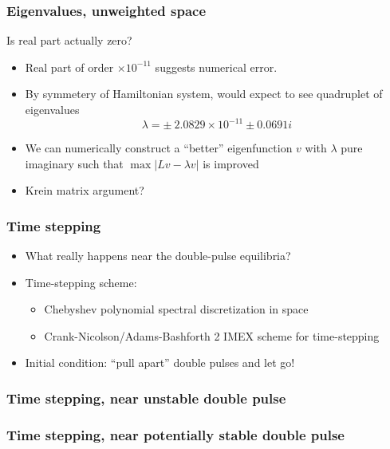 \documentclass[16pt]{beamer}
\begin{document}
\begin{frame}
	\frametitle{Eigenvalues, unweighted space}
	Is real part actually zero?
	\begin{itemize}
		\item<1->Real part of order $\times 10^{-11}$ suggests numerical error.
		\item<2->By symmetery of Hamiltonian system, would expect to see quadruplet of eigenvalues
		 \[ \lambda = \pm \: 2.0829 \times 10^{-11} \pm 0.0691i \]
		\item<3-> We can numerically construct a ``better'' eigenfunction $v$ with $\lambda$ pure imaginary such that $\max |Lv - \lambda v|$ is improved
		\item<4-> Krein matrix argument?
	\end{itemize}
\end{frame}

\begin{frame}
	\frametitle{Time stepping}
	\begin{itemize}
		\item<1->What really happens near the double-pulse equilibria?
		\item<2->Time-stepping scheme:
		\begin{itemize}
			\item Chebyshev polynomial spectral discretization in space
			\item Crank-Nicolson/Adams-Bashforth 2 IMEX scheme for time-stepping
		\end{itemize}
		\item<3->Initial condition: ``pull apart'' double pulses and let go!
	\end{itemize}
\end{frame}

\begin{frame}
	\frametitle{Time stepping, near unstable double pulse}
	\begin{center}
	\end{center}
\end{frame}

\begin{frame}
	\frametitle{Time stepping, near potentially stable double pulse}
	\begin{center}
	\end{center}
\end{frame}
\end{document}

